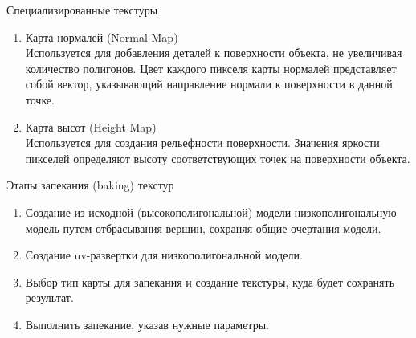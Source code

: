 \documentclass{beamer}
\begin{document}
	\begin{frame}{Специализированные текстуры}
		\begin{enumerate}
			\item Карта нормалей (Normal Map) \\
			Используется для добавления деталей к поверхности объекта, не увеличивая количество полигонов. 
			Цвет каждого пикселя карты нормалей представляет собой вектор, указывающий направление нормали к поверхности в данной точке.
			\item Карта высот (Height Map) \\
			Используется для создания рельефности поверхности. 
			Значения яркости пикселей определяют высоту соответствующих точек на поверхности объекта.
	
		\end{enumerate}

		\footnotesize
		Этапы запекания (baking) текстур \\
		\begin{enumerate}
			\item 
			Создание из исходной (высокополигональной) модели низкополигональную модель путем отбрасывания вершин, сохраняя общие очертания модели.
			\item 
			Создание uv-развертки для низкополигональной модели.
			\item 
			Выбор тип карты для запекания и создание текстуры, куда будет сохранять результат.
			\item 
			Выполнить запекание, указав нужные параметры.
		\end{enumerate}


		
	\end{frame}
\end{document}
